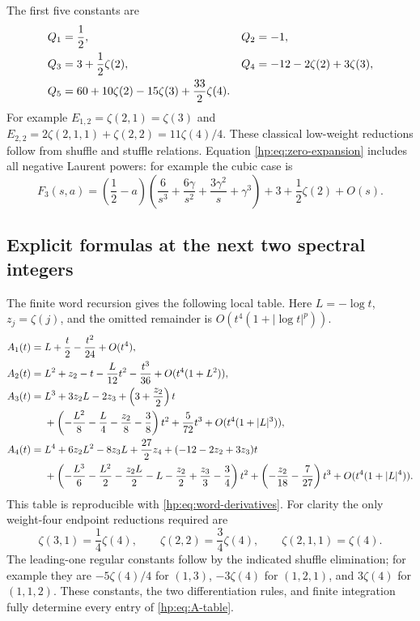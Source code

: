 The first five constants are
\begin{align}\label{hp:eq:Q-table}
 Q_1&=\frac12,& Q_2&=-1,\notag\\
 Q_3&=3+\frac12\zeta(2),&
 Q_4&=-12-2\zeta(2)+3\zeta(3),\notag\\
 Q_5&=60+10\zeta(2)-15\zeta(3)+\frac{33}{2}\zeta(4).
\end{align}
For example $E_{1,2}=\zeta(2,1)=\zeta(3)$ and
$E_{2,2}=2\zeta(2,1,1)+\zeta(2,2)=11\zeta(4)/4$.
These classical low-weight reductions follow from shuffle and stuffle
relations. Equation \eqref{hp:eq:zero-expansion} includes all negative
Laurent powers: for example the cubic case is
\[
 F_3(s,a)=\left(\frac12-a\right)
 \left(\frac6{s^3}+\frac{6\gamma}{s^2}+
                    \frac{3\gamma^2}{s}+\gamma^3\right)
         +3+\frac12\zeta(2)+O(s).
\]

\subsection{Explicit formulas at the next two spectral integers}

The finite word recursion gives the following local table. Here
$L=-\log t$, $z_j=\zeta(j)$, and the omitted remainder is
$O(t^4(1+|\log t|^p))$.
\begin{align}\label{hp:eq:A-table}
 A_1(t)={}&L+\frac t2-\frac{t^2}{24}+O(t^4),\notag\\
 A_2(t)={}&L^2+z_2-t-\frac{L}{12}t^2-\frac{t^3}{36}
                         +O(t^4(1+L^2)),\notag\\
 A_3(t)={}&L^3+3z_2L-2z_3+\left(3+\frac{z_2}{2}\right)t\notag\\
 &+\left(-\frac{L^2}{8}-\frac L4-\frac{z_2}{8}-\frac38\right)t^2
           +\frac5{72}t^3+O(t^4(1+|L|^3)),\notag\\
 A_4(t)={}&L^4+6z_2L^2-8z_3L+\frac{27}{2}z_4
             +(-12-2z_2+3z_3)t\notag\\
 &+\left(-\frac{L^3}{6}-\frac{L^2}{2}-\frac{z_2L}{2}-L
                 -\frac{z_2}{2}+\frac{z_3}{3}-\frac34\right)t^2
      +\left(-\frac{z_2}{18}-\frac7{27}\right)t^3
                     +O(t^4(1+|L|^4)).
\end{align}
This table is reproducible with \eqref{hp:eq:word-derivatives}.
For clarity the only weight-four endpoint reductions required are
\[
 \zeta(3,1)=\frac14\zeta(4),\qquad
 \zeta(2,2)=\frac34\zeta(4),\qquad
 \zeta(2,1,1)=\zeta(4).
\]
The leading-one regular constants follow by the indicated shuffle
elimination; for example they are $-5\zeta(4)/4$ for $(1,3)$,
$-3\zeta(4)$ for $(1,2,1)$, and $3\zeta(4)$ for $(1,1,2)$.
These constants, the two differentiation rules, and finite integration
fully determine every entry of \eqref{hp:eq:A-table}.

